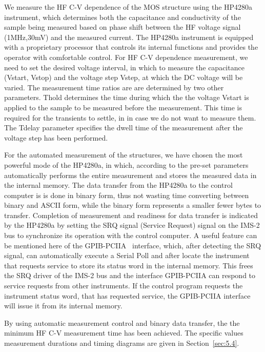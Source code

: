 We measure the HF C-V dependence of the MOS structure using the
HP4280a instrument, which determines both the capacitance and
conductivity of the sample being measured based on phase shift between
the HF voltage signal (1MHz,30mV) and the measured current. The
HP4280a instrument is equipped with a proprietary processor that
controls its internal functions and provides the operator with
comfortable control. For HF C-V dependence measurement, we need to set
the desired voltage interval, in which to measure the capacitance
(Vstart, Vstop) and the voltage step Vstep, at which the DC voltage
will be varied. The measurement time ratios are are determined by two
other parameters. Thold determines the time during which the the
voltage Vstart is applied to the sample to be measured before the
measurement. This time is required for the transients to settle, in in
case we do not want to measure them. The Tdelay parameter specifies
the dwell time of the measurement after the voltage step has been
performed.

For the automated measurement of the structures, we have chosen the
most powerful mode of the HP4280a, in which, according to the pre-set
parameters automatically performs the entire measurement and stores
the measured data in the internal memory.  The data transfer from the
HP4280a to the control computer is is done in binary form, thus not
wasting time converting between binary and ASCII form, while the
binary form represents a smaller fewer bytes to transfer. Completion
of measurement and readiness for data transfer is indicated by the
HP4280a by setting the SRQ signal (Service Request) signal on the
IMS-2 bus to synchronize its operation with the control computer.  A
useful feature can be mentioned here of the GPIB-PCIIA~\cite{5.2}
interface, which, after detecting the SRQ signal, can automatically
execute a Serial Poll and after locate the instrument that requests
service to store its status word in the internal memory. This frees
the SRQ driver of the IMS-2 bus and the interface GPIB-PCIIA can
respond to service requests from other instruments. If the control
program requests the instrument status word, that has requested
service, the GPIB-PCIIA interface will issue it from its internal
memory.

By using automatic measurement control and binary data transfer, the
the minimum HF C-V measurement time has been achieved.  The specific
values measurement durations and timing diagrams are given in
Section~\ref{sec:5.4}.

